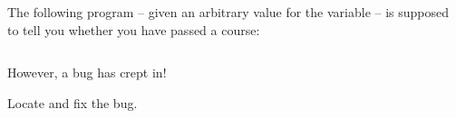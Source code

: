 The following program -- given an arbitrary value for the variable  -- is supposed to tell you whether you have passed a course:

\inputminted{csharp}{\context/question/Score.cs}

However, a bug has crept in!

Locate and fix the bug.
